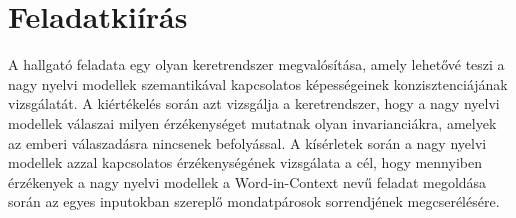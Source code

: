\documentclass[12pt]{report}
\begin{document}


    \chapter*{Feladatkiírás}


    A hallgató feladata egy olyan keretrendszer megvalósítása, amely lehetővé teszi a nagy nyelvi modellek szemantikával kapcsolatos képességeinek konzisztenciájának vizsgálatát.
    A kiértékelés során azt vizsgálja a keretrendszer, hogy a nagy nyelvi modellek válaszai milyen érzékenységet mutatnak olyan invarianciákra, amelyek az emberi válaszadásra nincsenek befolyással.
    A kísérletek során a nagy nyelvi modellek azzal kapcsolatos érzékenységének vizsgálata a cél, hogy mennyiben érzékenyek a nagy nyelvi modellek a Word-in-Context nevű feladat megoldása során az egyes inputokban szereplő mondatpárosok sorrendjének megcserélésére.
\end{document}
